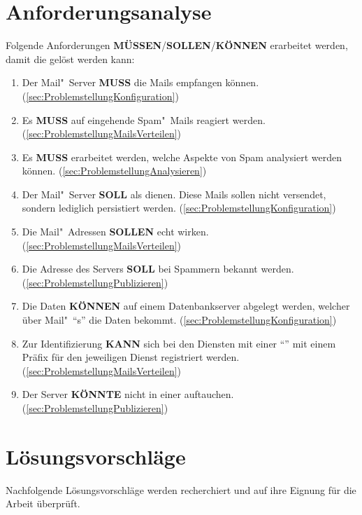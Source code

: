 \documentclass[a4paper,11pt,singlespacing]{article}
\begin{document}
\newpage


\section{Anforderungsanalyse}\label{sec:Anforderungsanalyse}
	Folgende Anforderungen \textbf{MÜSSEN}/\textbf{SOLLEN}/\textbf{KÖNNEN} erarbeitet werden, damit die  gelöst werden kann:

	\begin{enumerate}
	\item
		Der Mail"~Server \textbf{MUSS} die Mails empfangen können.
		(\ref{sec:ProblemstellungKonfiguration})
	\item
		Es \textbf{MUSS} auf eingehende Spam"~Mails reagiert werden.
		(\ref{sec:ProblemstellungMailsVerteilen})
	\item
		Es \textbf{MUSS} erarbeitet werden, welche Aspekte von Spam analysiert werden können.
		(\ref{sec:ProblemstellungAnalysieren})
	\item
		Der Mail"~Server \textbf{SOLL} als  dienen.
		Diese Mails sollen nicht versendet, sondern lediglich persistiert werden.
		(\ref{sec:ProblemstellungKonfiguration})
	\item
		Die Mail"~Adressen \textbf{SOLLEN} echt wirken.
		(\ref{sec:ProblemstellungMailsVerteilen})
	\item
		Die Adresse des  Servers \textbf{SOLL} bei Spammern bekannt werden.
		(\ref{sec:ProblemstellungPublizieren})
	\item
		Die Daten \textbf{KÖNNEN} auf einem Datenbankserver abgelegt werden, welcher über Mail"~"`s"' die Daten bekommt.
		(\ref{sec:ProblemstellungKonfiguration})
	\item
		Zur Identifizierung \textbf{KANN} sich bei den Diensten mit einer "`"' mit einem Präfix für den jeweiligen Dienst registriert werden.
		(\ref{sec:ProblemstellungMailsVerteilen})
	\item
		Der Server \textbf{KÖNNTE} nicht in einer   auftauchen.
		(\ref{sec:ProblemstellungPublizieren})
	\end{enumerate}

\newpage


\section{Lösungsvorschläge}\label{sec:Lösungsvorschläge}
	Nachfolgende Lösungsvorschläge werden recherchiert und auf ihre Eignung für die Arbeit überprüft.
\end{document}
